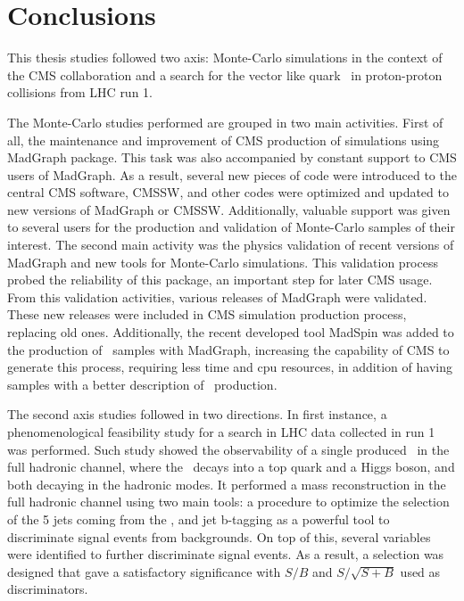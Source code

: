 \chapter*{Conclusions}

This thesis studies followed two axis: Monte-Carlo simulations in the context of the CMS collaboration and a search for the vector like quark \Tp~in proton-proton collisions from LHC run 1.

The Monte-Carlo studies performed are grouped in two main activities. First of all, the maintenance and improvement of CMS production of simulations using MadGraph package. This task was also accompanied by constant support to CMS users of MadGraph. As a result, several new pieces of code were introduced to the central CMS software, CMSSW, and other codes were optimized and updated to new versions of MadGraph or CMSSW. Additionally, valuable support was given to several users for the production and validation of Monte-Carlo samples of their interest. The second main activity was the physics validation of recent versions of MadGraph and new tools for Monte-Carlo simulations. This validation process probed the reliability of this package, an important step for later CMS usage. From this validation activities, various releases of MadGraph were validated. These new releases were included in CMS simulation production process, replacing old ones. Additionally, the recent developed tool MadSpin was added to the production of \ttbar~samples with MadGraph, increasing the capability of CMS to generate this process, requiring less time and cpu resources, in addition of having samples with a better description of \ttbar~production.

The second axis studies followed in two directions. In first instance, a phenomenological feasibility study for a search in LHC data collected in run 1 was performed. Such study showed the observability of a single produced \Tp~in the full hadronic channel, where the \Tp~decays into a top quark and a Higgs boson, and both decaying in the hadronic modes. It performed a mass reconstruction in the full hadronic channel using two main tools: a procedure to optimize the selection of the 5 jets coming from the \Tp, and jet b-tagging as a powerful tool to discriminate signal events from backgrounds. On top of this, several variables were identified to further discriminate signal events. As a result, a selection was designed that gave a satisfactory significance with $S/B$ and $S/\sqrt{S+B}$ used as discriminators.


